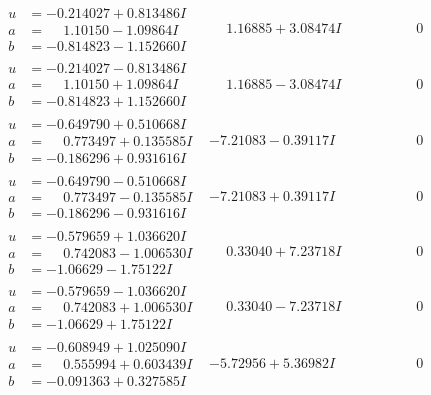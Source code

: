 \documentclass[1p]{elsarticle_modified}
\theoremstyle{definition}
\begin{document}
$$\begin{array}{c|c|c}
\begin{aligned}
u &= -0.214027 + 0.813486 I \\
a &= \phantom{-}1.10150 - 1.09864 I \\
b &= -0.814823 - 1.152660 I\end{aligned}
 & \phantom{-}1.16885 + 3.08474 I & \phantom{-0.000000 } 0 \\ \hline\begin{aligned}
u &= -0.214027 - 0.813486 I \\
a &= \phantom{-}1.10150 + 1.09864 I \\
b &= -0.814823 + 1.152660 I\end{aligned}
 & \phantom{-}1.16885 - 3.08474 I & \phantom{-0.000000 } 0 \\ \hline\begin{aligned}
u &= -0.649790 + 0.510668 I \\
a &= \phantom{-}0.773497 + 0.135585 I \\
b &= -0.186296 + 0.931616 I\end{aligned}
 & -7.21083 - 0.39117 I & \phantom{-0.000000 } 0 \\ \hline\begin{aligned}
u &= -0.649790 - 0.510668 I \\
a &= \phantom{-}0.773497 - 0.135585 I \\
b &= -0.186296 - 0.931616 I\end{aligned}
 & -7.21083 + 0.39117 I & \phantom{-0.000000 } 0 \\ \hline\begin{aligned}
u &= -0.579659 + 1.036620 I \\
a &= \phantom{-}0.742083 - 1.006530 I \\
b &= -1.06629 - 1.75122 I\end{aligned}
 & \phantom{-}0.33040 + 7.23718 I & \phantom{-0.000000 } 0 \\ \hline\begin{aligned}
u &= -0.579659 - 1.036620 I \\
a &= \phantom{-}0.742083 + 1.006530 I \\
b &= -1.06629 + 1.75122 I\end{aligned}
 & \phantom{-}0.33040 - 7.23718 I & \phantom{-0.000000 } 0 \\ \hline\begin{aligned}
u &= -0.608949 + 1.025090 I \\
a &= \phantom{-}0.555994 + 0.603439 I \\
b &= -0.091363 + 0.327585 I\end{aligned}
 & -5.72956 + 5.36982 I & \phantom{-0.000000 } 0 \\ \hline\begin{aligned}

\end{aligned}
\end{array}$$
\end{document}
